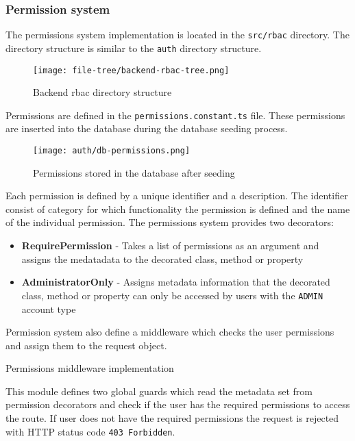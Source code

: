 \documentclass[../main.tex]{subfiles}
\begin{document}
\subsubsection{Permission system}

The permissions system implementation is located in the \texttt{src/rbac} directory. The directory structure is similar to the \texttt{auth} directory structure.

\begin{figure}[H]
  \centering
  \texttt{[image: file-tree/backend-rbac-tree.png]}
  \caption{Backend rbac directory structure}
\end{figure}

Permissions are defined in the \texttt{permissions.constant.ts} file. These permissions are inserted into the database during the database seeding process.
\begin{figure}[H]
  \centering
  \texttt{[image: auth/db-permissions.png]}
  \caption{Permissions stored in the database after seeding}
\end{figure}

Each permission is defined by a unique identifier and a description. The identifier consist of category for which functionality the permission is defined and the name of the individual permission.
The permissions system provides two decorators:
\begin{itemize}
  \item \textbf{RequirePermission} - Takes a list of permissions as an argument and assigns the medatadata to the decorated class, method or property
  \item \textbf{AdministratorOnly} - Assigns metadata information that the decorated class, method or property can only be accessed by users with the \texttt{ADMIN} account type
\end{itemize}

Permission system also define a middleware which checks the user permissions and assign them to the request object.

\begin{listing}[H]
  \caption{Permissions middleware implementation}
\end{listing}

This module defines two global guards which read the metadata set from permission decorators and check if the user has the required permissions to access the route.
If user does not have the required permissions the request is rejected with HTTP status code \texttt{403 Forbidden}.
\end{document}
